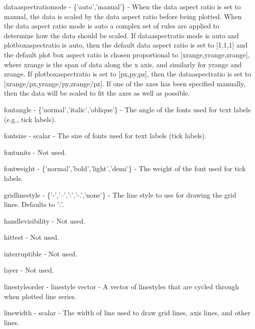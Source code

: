 \begin{DoxyItemize}
\item {\ttfamily dataaspectratiomode} -\/ {\ttfamily \{'auto','manual'\}} -\/ When the data aspect ratio is set to {\ttfamily manual}, the data is scaled by the data aspect ratio before being plotted. When the data aspect ratio mode is {\ttfamily auto} a complex set of rules are applied to determine how the data should be scaled. If {\ttfamily dataaspectratio} mode is {\ttfamily auto} and {\ttfamily plotboxaspectratio} is {\ttfamily auto}, then the default data aspect ratio is set to {\ttfamily \mbox{[}1,1,1\mbox{]}} and the default plot box aspect ratio is chosen proportional to {\ttfamily \mbox{[}xrange,yrange,zrange\mbox{]}}, where {\ttfamily xrange} is the span of data along the {\ttfamily x} axis, and similarly for {\ttfamily yrange} and {\ttfamily zrange}. If {\ttfamily plotboxaspectratio} is set to {\ttfamily \mbox{[}px,py,pz\mbox{]}}, then the {\ttfamily dataaspectratio} is set to {\ttfamily \mbox{[}xrange/px,yrange/py,zrange/pz\mbox{]}}. If one of the axes has been specified manually, then the data will be scaled to fit the axes as well as possible.  
\item {\ttfamily fontangle} -\/ {\ttfamily \{'normal','italic','oblique'\}} -\/ The angle of the fonts used for text labels (e.\-g., tick labels).  
\item {\ttfamily fontsize} -\/ {\ttfamily scalar} -\/ The size of fonts used for text labels (tick labels).  
\item {\ttfamily fontunits} -\/ Not used.  
\item {\ttfamily fontweight} -\/ {\ttfamily \{'normal','bold','light','demi'\}} -\/ The weight of the font used for tick labels.  
\item {\ttfamily gridlinestyle} -\/ {\ttfamily \{'-\/','--','\-:','-\/.','none'\}} -\/ The line style to use for drawing the grid lines. Defaults to {\ttfamily '\-:'}.  
\item {\ttfamily handlevisibility} -\/ Not used.  
\item {\ttfamily hittest} -\/ Not used.  
\item {\ttfamily interruptible} -\/ Not used.  
\item {\ttfamily layer} -\/ Not used.  
\item {\ttfamily linestyleorder} -\/ {\ttfamily linestyle vector} -\/ A vector of linestyles that are cycled through when plotted line series.  
\item {\ttfamily linewidth} -\/ {\ttfamily scalar} -\/ The width of line used to draw grid lines, axis lines, and other lines.  

\end{DoxyItemize}
